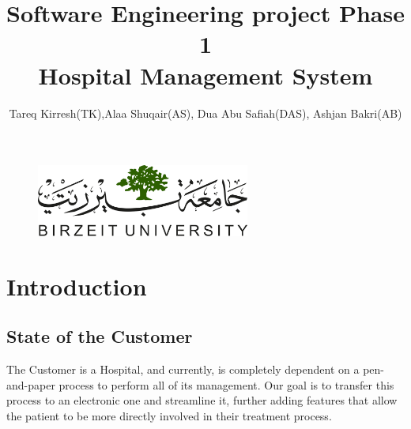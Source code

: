 \documentclass[14pt]{article}
\title{Software Engineering project Phase 1\\Hospital Management System}
\author{Tareq Kirresh(TK),Alaa Shuqair(AS), Dua Abu Safiah(DAS), Ashjan Bakri(AB)}
\begin{document}
\begin{figure}
\centering
  \includegraphics[width=7cm]{LOGO.png}
\end{figure}
\maketitle
\newpage
\tableofcontents 
\newpage 

\begin{versionhistory}
\end{versionhistory}
\newpage
\section{Introduction}
\subsection{State of the Customer}
The Customer is a Hospital, and currently, is completely dependent on a pen-and-paper process to perform all of its management. Our goal
is to transfer this process to an electronic one and streamline it, further adding features that allow the patient to be more 
directly involved in their treatment process. 
\end{document}
